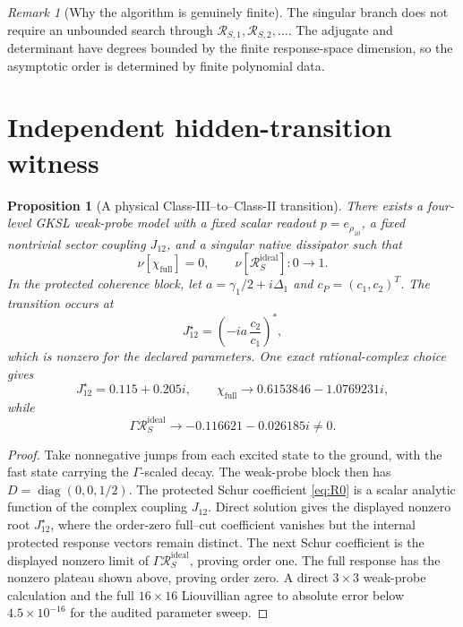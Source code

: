 \documentclass[11pt]{article}
\newtheorem{proposition}[theorem]{Proposition}
\theoremstyle{definition}
\theoremstyle{remark}
\newtheorem{remark}[theorem]{Remark}
\theoremstyle{plain}
\newcommand{\R}{\mathcal R}
\newcommand{\full}{\mathrm{full}}
\newcommand{\ideal}{\mathrm{ideal}}
\begin{document}
\begin{remark}[Why the algorithm is genuinely finite]
The singular branch does not require an unbounded search through $\R_{S,1},\R_{S,2},\ldots$.  The adjugate and determinant have degrees bounded by the finite response-space dimension, so the asymptotic order is determined by finite polynomial data.
\end{remark}

\section{Independent hidden-transition witness}

\begin{proposition}[A physical Class-III--to--Class-II transition]
\label{prop:phase-h}
There exists a four-level GKSL weak-probe model with a fixed scalar readout
$p=e_{\rho_{10}}$, a fixed nontrivial sector coupling $J_{12}$, and a singular
native dissipator such that
\[
 \nu[\chi_{\full}]=0,\qquad
 \nu[\R_S^{\ideal}]:0\longrightarrow1.
\]
In the protected coherence block, let
$a=\gamma_1/2+i\Delta_1$ and $c_P=(c_1,c_2)^T$.  The transition occurs at
\begin{equation}
 J_{12}^{\star}=\left(-ia\,\frac{c_2}{c_1}\right)^*,
\end{equation}
which is nonzero for the declared parameters.  One exact rational-complex
choice gives
\[
 J_{12}^{\star}=0.115+0.205i,\qquad
 \chi_{\full}\longrightarrow
 0.6153846-1.0769231i,
\]
while
\[
 \Gamma\R_S^{\ideal}\longrightarrow
 -0.116621-0.026185i\ne0.
\]
\end{proposition}

\begin{proof}
Take nonnegative jumps from each excited state to the ground, with the fast
state carrying the $\Gamma$-scaled decay.  The weak-probe block then has
$D=\operatorname{diag}(0,0,1/2)$.  The protected Schur coefficient
\eqref{eq:R0} is a scalar analytic function of the complex coupling $J_{12}$.
Direct solution gives the displayed nonzero root $J_{12}^{\star}$, where the
order-zero full--cut coefficient vanishes but the internal protected response
vectors remain distinct.  The next Schur coefficient is the displayed
nonzero limit of $\Gamma\R_S^{\ideal}$, proving order one.  The full response
has the nonzero plateau shown above, proving order zero.  A direct
$3\times3$ weak-probe calculation and the full $16\times16$ Liouvillian agree
to absolute error below $4.5\times10^{-16}$ for the audited parameter sweep.
\end{proof}
\end{document}
